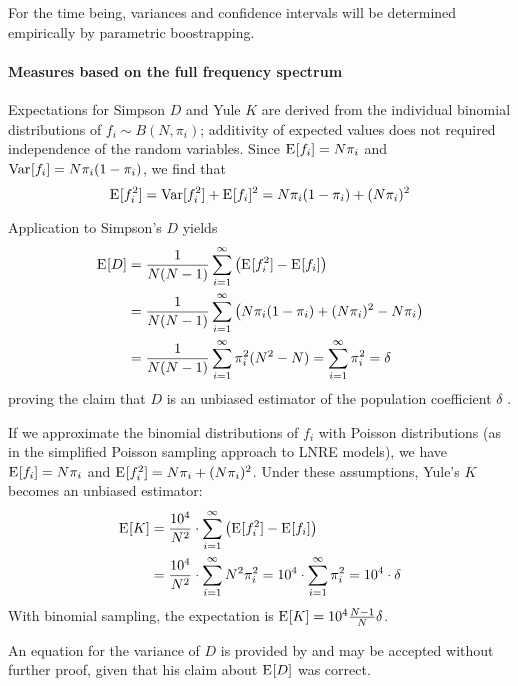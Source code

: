 \documentclass[a4paper]{article}
\begin{document}
For the time being, variances and confidence intervals will be determined
empirically by parametric boostrapping.

\paragraph{Measures based on the full frequency spectrum}
Expectations for Simpson $D$ and Yule $K$ are derived from the individual
binomial distributions of $f_i \sim B(N, \pi_i)$; additivity of expected
values does not required independence of the random variables.  Since
$\mathrm{E}_{}[f_i] = N \pi_i$ and $\mathop{\mathrm{Var}}_{}[f_i] = N \pi_i (1 - \pi_i)$, we find that
\begin{equation}
  \label{eq:prod:exp-D-1}
  \mathrm{E}_{}[f_i^2] = \mathop{\mathrm{Var}}_{}[f_i^2] + \mathrm{E}_{}[f_i]^2 = N \pi_i (1 - \pi_i) + (N \pi_i)^2
\end{equation}
Application to Simpson's $D$ yields
\begin{align*}
  \mathrm{E}_{}[D] & = \frac1{N(N-1)} \sum_{i=1}^{\infty} \left( \mathrm{E}_{}[f_i^2] - \mathrm{E}_{}[f_i] \right)\\
          & = \frac1{N(N-1)} \sum_{i=1}^{\infty} \left( N \pi_i (1 - \pi_i) + (N \pi_i)^2 - N \pi_i \right)\\
          & = \frac1{N(N-1)} \sum_{i=1}^{\infty} \pi_i^2 (N^2 - N)
            = \sum_{i=1}^{\infty} \pi_i^2 = \delta
\end{align*}
proving the claim that $D$ is an unbiased estimator of the population
coefficient $\delta$ \citep[688]{Simpson:49}.  

If we approximate the binomial distributions of $f_i$ with Poisson
distributions (as in the simplified Poisson sampling approach to LNRE models),
we have $\mathrm{E}_{}[f_i] = N \pi_i$ and $\mathrm{E}_{}[f_i^2] = N \pi_i + (N \pi_i)^2$. Under
these assumptions, Yule's $K$ becomes an unbiased estimator:
\begin{align*}
  \mathrm{E}_{}[K] & = \frac{10^4}{N^2} \cdot \sum_{i=1}^{\infty} \left( \mathrm{E}_{}[f_i^2] - \mathrm{E}_{}[f_i] \right) \\
          & = \frac{10^4}{N^2} \cdot \sum_{i=1}^{\infty} N^2 \pi_i^2
            = 10^4 \cdot \sum_{i=1}^{\infty} \pi_i^2 = 10^4 \cdot \delta
\end{align*}
With binomial sampling, the expectation is $\mathrm{E}_{}[K] = 10^4 \frac{N - 1}{N} \delta$.

An equation for the variance of $D$ is provided by \citet[688]{Simpson:49} and
may be accepted without further proof, given that his claim about $\mathrm{E}_{}[D]$
was correct.


\end{document}

